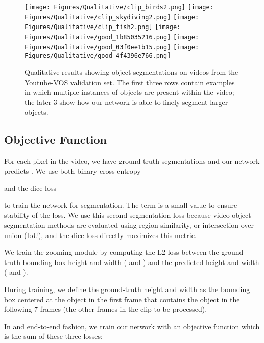 \documentclass[10pt,twocolumn,letterpaper]{article}
\begin{document}
\begin{figure*}[ht!]
\begin{center}
    
\texttt{[image: Figures/Qualitative/clip\_birds2.png]}
\texttt{[image: Figures/Qualitative/clip\_skydiving2.png]}
\texttt{[image: Figures/Qualitative/clip\_fish2.png]}
\texttt{[image: Figures/Qualitative/good\_1b85035216.png]}
\texttt{[image: Figures/Qualitative/good\_03f0ee1b15.png]}
\texttt{[image: Figures/Qualitative/good\_4f4396e766.png]}

\end{center}
   \caption{Qualitative results showing object segmentations on videos from the Youtube-VOS validation set. The first three rows contain examples in which multiple instances of objects are present within the video; the later 3 show how our network is able to finely segment larger objects.}
\label{fig:qualitative-good}
\end{figure*}


\subsection{Objective Function} \label{section:objective}
For each pixel  in the video, we have ground-truth segmentations  and our network predicts . We use both binary cross-entropy

and the dice loss \cite{milletari2016v}

to train the network for segmentation. The  term is a small value to ensure stability of the loss. We use this second segmentation loss because video object segmentation methods are evaluated using region similarity, or intersection-over-union (IoU), and the dice loss directly maximizes this metric.

We train the zooming module by computing the L2 loss between the ground-truth bounding box height and width ( and ) and the predicted height and width ( and ).

During training, we define the ground-truth height and width as the bounding box centered at the object in the first frame that contains the object in the following 7 frames (the other frames in the clip to be processed).

In and end-to-end fashion, we train our network with an objective function which is the sum of these three losses: 
\end{document}

